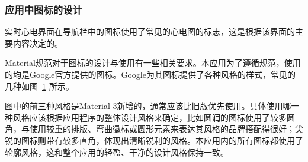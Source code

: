 \subsubsection{应用中图标的设计}\label{subsubsec:icons}

实时心电界面在导航栏中的图标使用了常见的心电图的标志，这是根据该界面的主要内容决定的。

Material规范对于图标的设计与使用有一些相关要求。本应用为了遵循规范，使用的均是Google官方提供的图标。Google为其图标提供了各种风格的样式，常见的几种如图~\ref{fig:icons} 所示。

\begin{figure}[ht]
    \centering
    \label{fig:icons}
\end{figure}

图中的前三种风格是Material 3新增的，通常应该比旧版优先使用。具体使用哪一种风格应该根据应用程序的整体设计风格来确定，比如圆润的图标使用了较多圆角，与使用较重的排版、弯曲徽标或圆形元素来表达其风格的品牌搭配得很好；尖锐的图标则带有较多直角，体现出清晰锐利的风格。本应用内的所有图标都使用了轮廓风格，这和整个应用的轻盈、干净的设计风格保持一致。

